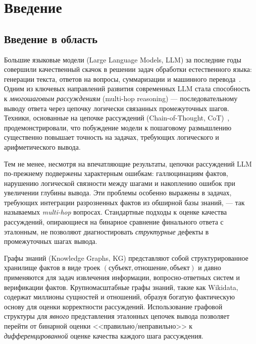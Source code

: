 \section{Введение}
\label{sec:Chapter0} 

\subsection{Введение в область}
\label{subsec:intro-area}

Большие языковые модели (Large Language Models, LLM) за последние годы совершили качественный скачок в решении задач обработки естественного языка: генерации текста, ответов на вопросы, суммаризации и машинного перевода~\cite{brown2020language, touvron2023llama, openai2023gpt4}. Одним из ключевых направлений развития современных LLM стала способность к \textit{многошаговым рассуждениям} (multi-hop reasoning) --- последовательному выводу ответа через цепочку логически связанных промежуточных шагов. Техники, основанные на цепочке рассуждений (Chain-of-Thought, CoT)~\cite{wei2022chain}, продемонстрировали, что побуждение модели к пошаговому размышлению существенно повышает точность на задачах, требующих логического и арифметического вывода.

Тем не менее, несмотря на впечатляющие результаты, цепочки рассуждений LLM по-прежнему подвержены характерным ошибкам: галлюцинациям фактов, нарушению логической связности между шагами и накоплению ошибок при увеличении глубины вывода. Эти проблемы особенно выражены в задачах, требующих интеграции разрозненных фактов из обширной базы знаний, --- так называемых \textit{multi-hop} вопросах. Стандартные подходы к оценке качества рассуждений, опирающиеся на бинарное сравнение финального ответа с эталонным, не позволяют диагностировать \textit{структурные} дефекты в промежуточных шагах вывода.

Графы знаний (Knowledge Graphs, KG) представляют собой структурированное хранилище фактов в виде троек $(\text{субъект}, \text{отношение}, \text{объект})$ и давно применяются для задач извлечения информации, вопросно-ответных систем и верификации фактов. Крупномасштабные графы знаний, такие как Wikidata, содержат миллионы сущностей и отношений, образуя богатую фактическую основу для оценки корректности рассуждений. Использование графовой структуры для \textit{явного} представления эталонных цепочек вывода позволяет перейти от бинарной оценки <<правильно/неправильно>> к \textit{дифференцированной} оценке качества каждого шага рассуждения.

